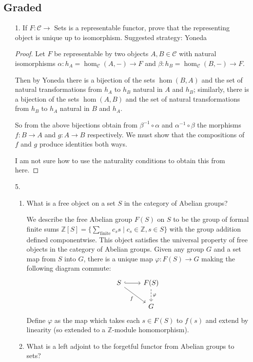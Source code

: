 \documentclass[11pt]{article}
\begin{document}
\subsection*{Graded}
\begin{enumerate}
    \item[1.] If $F\colon\mathcal{C}\to$ Sets is a representable functor, prove that the representing object is unique up to isomorphism. Suggested strategy: Yoneda \begin{proof}
        Let $F$ be representable by two objects $A, B\in \mathcal{C}$ with natural isomorphisms $\alpha\colon h_A = \hom_{\mathcal{C}}(A,-)\to F$ and $\beta\colon h_B = \hom_{\mathcal{C}}(B,-)\to F$.

        Then by Yoneda there is a bijection of the sets $\hom(B,A)$ and the set of natural transformations from $h_A$ to $h_B$ natural in $A$ and $h_B$; similarly, there is a bijection of the sets $\hom(A,B)$ and the set of natural transformations from $h_B$ to $h_A$ natural in $B$ and $h_A$.

        So from the above bijections obtain from $\beta^{-1}\circ \alpha$ and $\alpha^{-1}\circ \beta$ the morphisms $f\colon B\to A$ and $g\colon A\to B$ respectively. We must show that the compositions of $f$ and $g$ produce identities both ways.

        I am not sure how to use the naturality conditions to obtain this from here.
    \end{proof} 
    \item[5.] \begin{enumerate}[label=(\roman*)]
        \item What is a free object on a set $S$ in the category of Abelian groups?
        
        We describe the free Abelian group $F(S)$ on $S$ to be the group of formal finite sums $\mathbb{Z}[S] = \{\sum_{\text{finite}} c_s s\mid c_s\in \mathbb{Z}, s\in S\}$ with the group addition defined componentwise. This object satisfies the universal property of free objects in the category of Abelian groups. Given any group $G$ and a set map from $S$ into $G$, there is a unique map $\varphi\colon F(S)\to G$ making the following diagram commute: %
        \[\begin{tikzcd}
            S & {F(S)} \\
            & G
            \arrow["f"', from=1-1, to=2-2]
            \arrow[hook, from=1-1, to=1-2]
            \arrow["\varphi", dashed, from=1-2, to=2-2]
        \end{tikzcd}\] Define $\varphi$ as the map which takes each $s\in F(S)$ to $f(s)$ and extend by linearity (so extended to a $\mathbb{Z}$-module homomorphism).
        \item What is a left adjoint to the forgetful functor from Abelian groups to sets?
        

\end{enumerate}
\end{enumerate}
\end{document}

